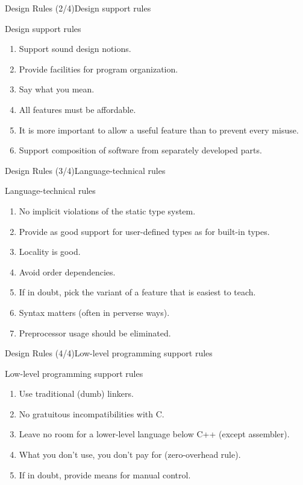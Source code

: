 \begin{frame}{Design Rules (2/4)}{Design support rules}
  \begin{block}{Design support rules}
    \begin{enumerate}
    \item
      Support sound design notions.
    \item
      Provide facilities for program organization.
    \item
      Say what you mean.
    \item
      All features must be affordable.
    \item
      It is more important to allow a useful feature than to prevent every misuse.
    \item
      Support composition of software from separately developed parts.
    \end{enumerate}
  \end{block}
\end{frame}

\begin{frame}{Design Rules (3/4)}{Language-technical rules}
  \begin{block}{Language-technical rules}
    \begin{enumerate}
    \item
      No implicit violations of the static type system.
    \item
      Provide as good support for user-defined types as for built-in types.
    \item
      Locality is good.
    \item
      Avoid order dependencies.
    \item
      If in doubt, pick the variant of a feature that is easiest to teach.
    \item
      Syntax matters (often in perverse ways).
    \item
      Preprocessor usage should be eliminated.
    \end{enumerate}
  \end{block}
\end{frame}

\begin{frame}{Design Rules (4/4)}{Low-level programming support rules}
  \begin{block}{Low-level programming support rules}
    \begin{enumerate}
    \item
      Use traditional (dumb) linkers.
    \item
      No gratuitous incompatibilities with C.
    \item
      Leave no room for a lower-level language below C++ (except assembler).
    \item
      What you don’t use, you don’t pay for (zero-overhead rule).
    \item
      If in doubt, provide means for manual control.
    \end{enumerate}
  \end{block}
\end{frame}

